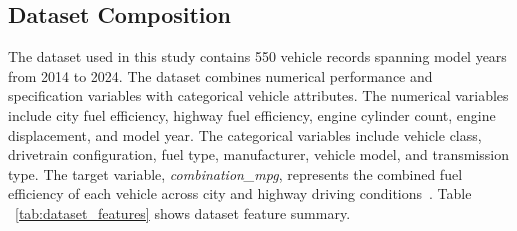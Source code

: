 \subsection{Dataset Composition}

The dataset used in this study contains 550 vehicle records spanning model years from 2014 to 2024. The dataset combines numerical performance and specification variables with categorical vehicle attributes. The numerical variables include city fuel efficiency, highway fuel efficiency, engine cylinder count, engine displacement, and model year. The categorical variables include vehicle class, drivetrain configuration, fuel type, manufacturer, vehicle model, and transmission type. The target variable, \textit{combination\_mpg}, represents the combined fuel efficiency of each vehicle across city and highway driving conditions~\cite{atique2026explainable}.  Table ~\ref{tab:dataset_features} shows dataset feature summary.\cite{atique2026explainable}

